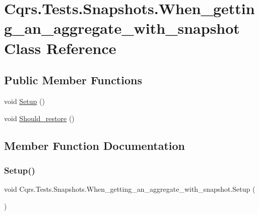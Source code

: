 \hypertarget{classCqrs_1_1Tests_1_1Snapshots_1_1When__getting__an__aggregate__with__snapshot}{}\section{Cqrs.\+Tests.\+Snapshots.\+When\+\_\+getting\+\_\+an\+\_\+aggregate\+\_\+with\+\_\+snapshot Class Reference}
\label{classCqrs_1_1Tests_1_1Snapshots_1_1When__getting__an__aggregate__with__snapshot}
\subsection*{Public Member Functions}
\begin{DoxyCompactItemize}
\item 
void \hyperlink{classCqrs_1_1Tests_1_1Snapshots_1_1When__getting__an__aggregate__with__snapshot_a25f0b56fe36be101b7fe4f38db502254_a25f0b56fe36be101b7fe4f38db502254}{Setup} ()
\item 
void \hyperlink{classCqrs_1_1Tests_1_1Snapshots_1_1When__getting__an__aggregate__with__snapshot_a48aea1a3e8b6248e2bc1225f8c549d24_a48aea1a3e8b6248e2bc1225f8c549d24}{Should\+\_\+restore} ()
\end{DoxyCompactItemize}


\subsection{Member Function Documentation}
\mbox{\label{classCqrs_1_1Tests_1_1Snapshots_1_1When__getting__an__aggregate__with__snapshot_a25f0b56fe36be101b7fe4f38db502254_a25f0b56fe36be101b7fe4f38db502254}} 
\subsubsection{\texorpdfstring{Setup()}{Setup()}}
{\footnotesize\ttfamily void Cqrs.\+Tests.\+Snapshots.\+When\+\_\+getting\+\_\+an\+\_\+aggregate\+\_\+with\+\_\+snapshot.\+Setup (\begin{DoxyParamCaption}{ }\end{DoxyParamCaption})}

